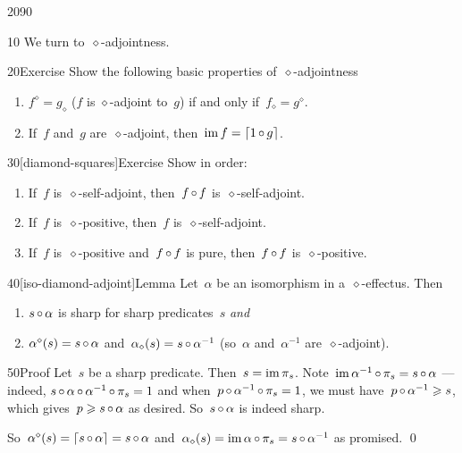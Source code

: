 \begin{parsec}{2090}%
\begin{point}{10}%
We turn to~$\diamond$-adjointness.
\end{point}
\begin{point}{20}{Exercise}%
Show the following basic properties of~$\diamond$-adjointness
\begin{enumerate}
    \item
$f^\diamond = g_\diamond$
    ($f$ is $\diamond$-adjoint to~$g$)
    if and only if~$f_\diamond = g^\diamond$.
    \item
If~$f$ and~$g$ are~$\diamond$-adjoint,
    then~$\operatorname{im} f = \left\lceil1 \mathop{\circ} g\right\rceil$.
\end{enumerate}
\end{point}
\begin{point}{30}[diamond-squares]{Exercise}%
Show in order:
\begin{enumerate}
\item
If~$f$ is~$\diamond$-self-adjoint,
    then~$f \mathop{\circ} f$ is~$\diamond$-self-adjoint.
\item
If~$f$ is~$\diamond$-positive,
    then~$f$ is~$\diamond$-self-adjoint.
\item
If~$f$ is~$\diamond$-positive and~$f\mathop{\circ} f$ is pure,
    then~$f \mathop{\circ} f$ is~$\diamond$-positive.
\end{enumerate}
\end{point}
\begin{point}{40}[iso-diamond-adjoint]{Lemma}%
Let~$\alpha$ be an isomorphism in a~$\diamond$-effectus.
Then
\begin{enumerate}
\item
    $s\mathop{\circ}\alpha$ is sharp for sharp predicates~$s$ \emph{and}
\item
    $\alpha^\diamond(s) = s \mathop{\circ} \alpha$
    and~$\alpha_\diamond(s) = s\mathop{\circ} \alpha^{-1}$
    (so~$\alpha$ and~$\alpha^{-1}$ are~$\diamond$-adjoint).
\end{enumerate}
\begin{point}{50}{Proof}%
Let~$s$ be a sharp predicate. Then~$s = \operatorname{im} \pi_s$.
Note~$\operatorname{im} \alpha^{-1}\mathop{\circ} \pi_s = s \mathop{\circ} \alpha$
    --- indeed, $s \mathop{\circ} \alpha \mathop{\circ} \alpha^{-1} \mathop{\circ} \pi_s=1$
    and when~$p \mathop{\circ} \alpha^{-1} \mathop{\circ} \pi_s=1$,
    we must have~$p \mathop{\circ} \alpha^{-1} \geqslant s$,
    which gives~$p \geqslant s \mathop{\circ} \alpha$ as desired.
    So~$s \mathop{\circ} \alpha$ is indeed sharp.

So~$\alpha^\diamond(s) = \left\lceil s \mathop{\circ} \alpha\right\rceil = s\mathop{\circ} \alpha$
    and~$\alpha_\diamond(s) = \operatorname{im} \alpha \mathop{\circ} \pi_s = s \mathop{\circ} \alpha^{-1}$
    as promised. \qed
\end{point}
\end{point}
\end{parsec}

